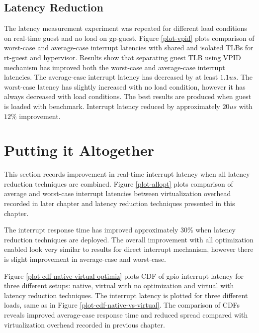 \subsection{Latency Reduction}



The latency measurement experiment was repeated for different load conditions on real-time guest and no load on gp-guest. 
Figure \ref{plot-vpid} plots comparison of worst-case and average-case interrupt latencies with shared and isolated TLBs for rt-guest and hypervisor. 
Results show that separating guest TLB using VPID mechanism has improved both the worst-case and average-case interrupt latencies.
The average-case interrupt latency has decreased by at least $1.1us$. The worst-case latency has slightly increased with no load condition,
however it has always decreased with load conditions. 
The best results are produced when guest is loaded with \mthreadops{} benchmark. 
Interrupt latency reduced by approximately $20us$ with $12\%$ improvement.

\section{Putting it Altogether}
This section records improvement in real-time interrupt latency when all latency reduction techniques are combined.
Figure \ref{plot-allopt} plots comparison of average and worst-case interrupt latencies between virtualization overhead recorded in later 
chapter and latency reduction techniques presented in this chapter.


The interrupt response time has improved approximately $30\%$ when latency reduction techniques are deployed.
The overall improvement with all optimization enabled look very similar to results for direct interrupt mechanism, however there is slight improvement in average-case and worst-case.

Figure \ref{plot-cdf-native-virtual-optimiz} plots CDF of gpio interrupt latency for three different setups: native, virtual with no optimization and virtual with latency reduction techniques. The interrupt latency is plotted for three different loads, same as in Figure \ref{plot-cdf-native-vs-virtual}.
The comparison of CDFs reveals improved average-case response time and reduced spread compared with virtualization overhead recorded in previous chapter.






